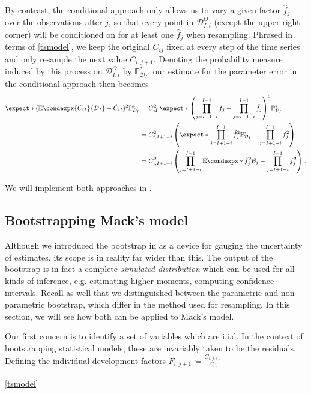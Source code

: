 \documentclass[a4paper]{book}
\theoremstyle{plain}
\newcommand{\condexp}{\mathbb{E}\condexpx}
\begin{document}
By contrast, the conditional approach only allows us to vary a given factor $\hat{f}_j$ over the observations after $j$, so that every point in $\mathcal{D}^O_{I, i}$ (except the upper right corner) will be conditioned on for at least one $\hat{f}_j$ when resampling. Phrased in terms of \eqref{tsmodel}, we keep the original $C_{ij}$ fixed at every step of the time series and only resample the next value $C_{i, j+1}$. Denoting the probability measure induced by this process on $\mathcal{D}^O_{I, i}$ by $\mathbb{P}^*_{\mathcal{D}_I}$, our estimate for the parameter error in the conditional approach then becomes
\begin{align}
    \expect*{(\condexp{C_{iI}}{\mathcal{D}_I} - \hat{C}_{iI})^2}{\mathbb{P}^*_{\mathcal{D}_I}}&= C^2_{iI} \, \expect*{\left( \prod_{j=I+1-i}^{I-1}f_j - \prod_{j=I+1-i}^{I-1}\hat{f}_j \right)^2}{\mathbb{P}^*_{\mathcal{D}_I}} \\ 
    &= C^2_{i, I+1-i} \left( \expect*{\prod_{j=I+1-i}^{I-1}\hat{f}^2_j}{\mathbb{P}^*_{\mathcal{D}_I}} - \prod_{j=I+1-i}^{I-1}f^2_j \right) \\
    &= C^2_{i, I+1-i} \left( \prod_{j=I+1-i}^{I-1} \condexp*{\hat{f}^2_j}{\mathcal{B}_j} - \prod_{j=I+1-i}^{I-1}f^2_j \right) \,.
\end{align}

We will implement both approaches in .

\subsection{Bootstrapping Mack's model}

Although we introduced the bootstrap in  as a device for gauging the uncertainty of estimates, its scope is in reality far wider than this. The output of the bootstrap is in fact a complete \emph{simulated distribution} which can be used for all kinds of inference, e.g. estimating higher moments, computing confidence intervals. Recall as well that we distinguished between the parametric and non-parametric bootstrap, which differ in the method used for resampling. In this section, we will see how both can be applied to Mack's model.

Our first concern is to identify a set of variables which are i.i.d. In the context of bootstrapping statistical models, these are invariably taken to be the residuals. Defining the individual development factors $F_{i, j+1} \coloneqq \frac{C_{i, j + 1}}{C_{ij}}$

\eqref{tsmodel}
\end{document}
